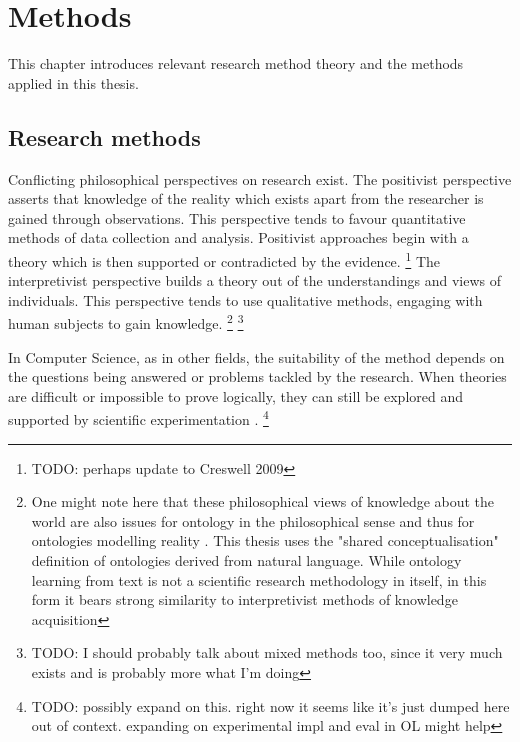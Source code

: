 \documentclass[a4paper]{report}
\newcommand{\todo}[1]{\footnote{{\color{red} TODO: #1}}}
\begin{document}
\chapter{Methods}

This chapter introduces relevant research method theory and the methods applied in this thesis.

\section{Research methods}
\label{sec:methods:research}
Conflicting philosophical perspectives on research exist.
The positivist perspective asserts that knowledge of the reality which exists apart from the researcher is gained through observations.
This perspective tends to favour quantitative methods of data collection and analysis.
Positivist approaches begin with a theory which is then supported or contradicted by the evidence.
\cite[p.6-7]{creswell2003research}\todo{perhaps update to Creswell 2009}
The interpretivist perspective builds a theory out of the understandings and views of individuals.
This perspective tends to use qualitative methods, engaging with human subjects to gain knowledge.
\cite[p.7-9]{creswell2003research}
\footnote{One might note here that these philosophical views of knowledge about the world are also issues for ontology in the philosophical sense and thus for ontologies modelling reality \cite[p.6]{creswell2003research}\cite{sep-hermeneutics}.
This thesis uses the "shared conceptualisation" definition of ontologies derived from natural language.
While ontology learning from text is not a scientific research methodology in itself, in this form it bears strong similarity to interpretivist methods of knowledge acquisition}
\todo{I should probably talk about mixed methods too, since it very much exists and is probably more what I'm doing}

In Computer Science, as in other fields, the suitability  of the method depends on the questions being answered or problems tackled by the research.
When theories are difficult or impossible to prove logically, they can still be explored and supported by scientific experimentation \cite{Blomqvist09Thesis,Crnkovic2002SciMethCS}.
\todo{possibly expand on this. right now it seems like it's just dumped here out of context. expanding on experimental impl and eval in OL might help}
\end{document}
